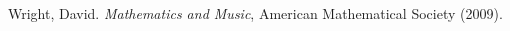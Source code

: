 	\begin{thebibliography}{00}
			
			
			{\sc Wright, David.} 
			\textit{Mathematics and Music},
			American Mathematical Society 
			(2009).
			
			
%			
%			
			

					
%			
%			
%			
			
			
			

\end{thebibliography}
